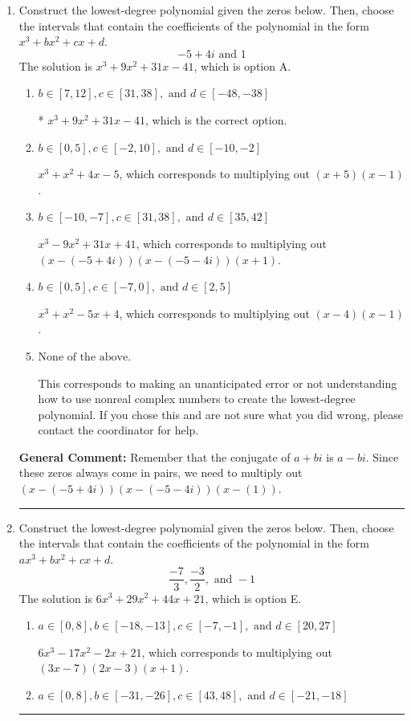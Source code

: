 \documentclass{extbook}[14pt]
\newcommand{\litem}[1]{\item #1

\rule{\textwidth}{0.4pt}}
\begin{document}
\begin{enumerate}\litem{
Construct the lowest-degree polynomial given the zeros below. Then, choose the intervals that contain the coefficients of the polynomial in the form $x^3+bx^2+cx+d$.
\[ -5 + 4 i \text{ and } 1 \]The solution is \( x^{3} +9 x^{2} +31 x -41 \), which is option A.\begin{enumerate}[label=\Alph*.]
\item \( b \in [7, 12], c \in [31, 38], \text{ and } d \in [-48, -38] \)

* $x^{3} +9 x^{2} +31 x -41$, which is the correct option.
\item \( b \in [0, 5], c \in [-2, 10], \text{ and } d \in [-10, -2] \)

$x^{3} + x^{2} +4 x -5$, which corresponds to multiplying out $(x + 5)(x -1)$.
\item \( b \in [-10, -7], c \in [31, 38], \text{ and } d \in [35, 42] \)

$x^{3} -9 x^{2} +31 x + 41$, which corresponds to multiplying out $(x-(-5 + 4 i))(x-(-5 - 4 i))(x + 1)$.
\item \( b \in [0, 5], c \in [-7, 0], \text{ and } d \in [2, 5] \)

$x^{3} + x^{2} -5 x + 4$, which corresponds to multiplying out $(x -4)(x -1)$.
\item \( \text{None of the above.} \)

This corresponds to making an unanticipated error or not understanding how to use nonreal complex numbers to create the lowest-degree polynomial. If you chose this and are not sure what you did wrong, please contact the coordinator for help.
\end{enumerate}

\textbf{General Comment:} Remember that the conjugate of $a+bi$ is $a-bi$. Since these zeros always come in pairs, we need to multiply out $(x-(-5 + 4 i))(x-(-5 - 4 i))(x-(1))$.
}
\litem{
Construct the lowest-degree polynomial given the zeros below. Then, choose the intervals that contain the coefficients of the polynomial in the form $ax^3+bx^2+cx+d$.
\[ \frac{-7}{3}, \frac{-3}{2}, \text{ and } -1 \]The solution is \( 6x^{3} +29 x^{2} +44 x + 21 \), which is option E.\begin{enumerate}[label=\Alph*.]
\item \( a \in [0, 8], b \in [-18, -13], c \in [-7, -1], \text{ and } d \in [20, 27] \)

$6x^{3} -17 x^{2} -2 x + 21$, which corresponds to multiplying out $(3x -7)(2x -3)(x + 1)$.
\item \( a \in [0, 8], b \in [-31, -26], c \in [43, 48], \text{ and } d \in [-21, -18] \)


\end{enumerate}}
\end{enumerate}
\end{document}
